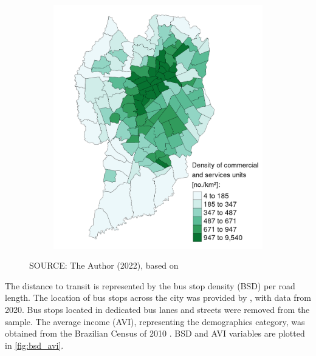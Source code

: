 \begin{figure}[!htbp]
\begin{subfigure}{0.5\textwidth}
        \includegraphics{fig/map_DCSU.png}
    \end{subfigure}
    \label{fig:snd_dcsu}
    \par SOURCE: The Author (2022), based on \textcite{IPPUC2018b,IPPUC2021}
\end{figure}

The distance to transit is represented by the bus stop density (BSD) per road length. The location of bus stops across the city was provided by \textcite{IPPUC2020a}, with data from 2020. Bus stops located in dedicated bus lanes and streets were removed from the sample. The average income (AVI), representing the demographics category, was obtained from the Brazilian Census of 2010 \cite{IBGE2010}. BSD and AVI variables are plotted in \autoref{fig:bsd_avi}. 

